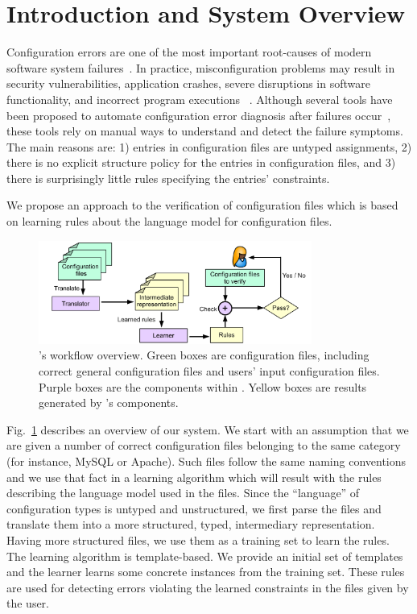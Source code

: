 \section{Introduction and System Overview}
\label{sec:Intro}

Configuration errors are one of the most important root-causes of
modern software system failures~\cite{xu15systems,yin11anempirical}.
In practice, misconfiguration problems may result in security
vulnerabilities, application crashes, severe disruptions in software
functionality, and incorrect program executions%
~\cite{xu15systems,zhang14encore,yuan11context}.  Although several
tools have been proposed to automate configuration error diagnosis
after failures occur~\cite{wang04automatic,attariyan10automating,
su07autobash,whitaker04configuration}, these tools rely on manual ways
  to understand and detect the failure symptoms. The main reasons are:
  1) entries in configuration files are untyped assignments, 2) there
  is no explicit structure policy for the entries in configuration
  files, and 3) there is surprisingly little rules specifying the
  entries' constraints.

We propose an approach to the verification of  
configuration files which is based on learning rules about the language 
model for configuration files. 

\begin{figure}[t] \centering
\includegraphics[width=0.8\textwidth]{figs/overview}
\caption{\app's workflow overview. Green boxes are configuration files,
  including correct general configuration files and users' input
  configuration files. Purple boxes are the components within \app.
  Yellow boxes are results generated by \app's components.}
\label{fig-overview}
\end{figure}

Fig.~\ref{fig-overview} describes an overview of our system. We start
with an assumption that we are given a number of correct configuration
files belonging to the same category (for instance, MySQL or
Apache). Such files follow the same naming conventions and we use that
fact in a learning algorithm which will result with the rules
describing the language model used in the files. Since the
``language'' of configuration types is untyped and unstructured, we
first parse the files and translate them into a more structured,
typed, intermediary representation. Having more structured files, we
use them as a training set to learn the rules. The learning algorithm
is template-based. We provide an initial set of templates and the
learner learns some concrete instances from the training set. These
rules are used for detecting errors violating the learned constraints
in the files given by the user.

